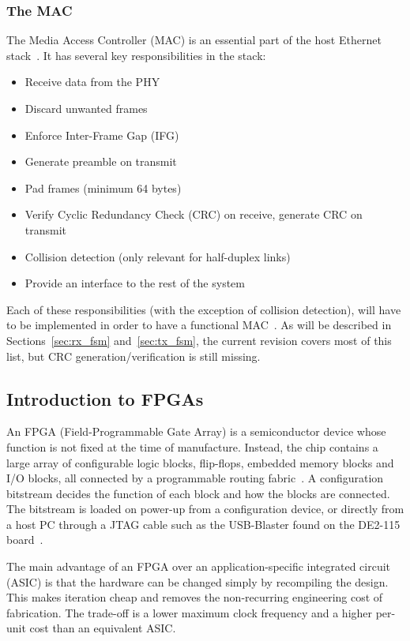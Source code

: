 \documentclass[11pt,a4paper]{article}
\begin{document}
\subsubsection{The MAC}
The Media Access Controller (MAC) is an essential part of the host Ethernet stack~\cite{ieee8023}. It has several key responsibilities in the stack:
\begin{itemize}
    \item Receive data from the PHY
    \item Discard unwanted frames
    \item Enforce Inter-Frame Gap (IFG)
    \item Generate preamble on transmit
    \item Pad frames (minimum 64 bytes)
    \item Verify Cyclic Redundancy Check (CRC) on receive, generate CRC on transmit
    \item Collision detection (only relevant for half-duplex links)
    \item Provide an interface to the rest of the system
\end{itemize}
Each of these responsibilities (with the exception of collision detection), will have to be implemented in order to have a functional MAC~\cite{ieee8023}.
As will be described in Sections~\ref{sec:rx_fsm} and~\ref{sec:tx_fsm}, the current revision covers most of this list, but CRC generation/verification is still missing.

\subsection{Introduction to FPGAs}
An FPGA (Field-Programmable Gate Array) is a semiconductor device whose function is not fixed at the time of manufacture.
Instead, the chip contains a large array of configurable logic blocks, flip-flops, embedded memory blocks and I/O blocks, all connected by a programmable routing fabric~\cite{cycloneiv}.
A configuration bitstream decides the function of each block and how the blocks are connected.
The bitstream is loaded on power-up from a configuration device, or directly from a host PC through a JTAG cable such as the USB-Blaster found on the DE2-115 board~\cite{terasic_de2}.

The main advantage of an FPGA over an application-specific integrated circuit (ASIC) is that the hardware can be changed simply by recompiling the design.
This makes iteration cheap and removes the non-recurring engineering cost of fabrication.
The trade-off is a lower maximum clock frequency and a higher per-unit cost than an equivalent ASIC.
\end{document}
